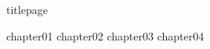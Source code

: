 \documentclass[
	,a4paper
	,12pt
	,oneside
]{book}
\begin{document}
\frontmatter

	{titlepage}
	\tableofcontents

\mainmatter

	{chapter01}
	{chapter02}
	{chapter03}
	{chapter04}

\backmatter
\end{document}
